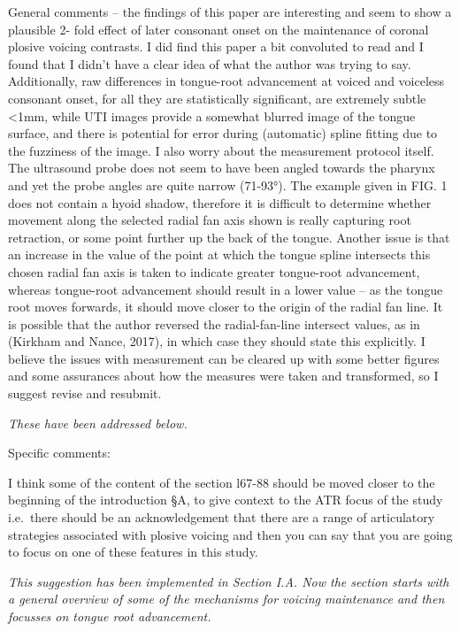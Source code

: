 \documentclass[]{article}
\begin{document}
General comments -- the findings of this paper are interesting and seem
to show a plausible 2- fold effect of later consonant onset on the
maintenance of coronal plosive voicing contrasts. I did find this paper
a bit convoluted to read and I found that I didn't have a clear idea of
what the author was trying to say. Additionally, raw differences in
tongue-root advancement at voiced and voiceless consonant onset, for all
they are statistically significant, are extremely subtle \textless{}1mm,
while UTI images provide a somewhat blurred image of the tongue surface,
and there is potential for error during (automatic) spline fitting due
to the fuzziness of the image. I also worry about the measurement
protocol itself. The ultrasound probe does not seem to have been angled
towards the pharynx and yet the probe angles are quite narrow (71-93°).
The example given in FIG. 1 does not contain a hyoid shadow, therefore
it is difficult to determine whether movement along the selected radial
fan axis shown is really capturing root retraction, or some point
further up the back of the tongue. Another issue is that an increase in
the value of the point at which the tongue spline intersects this chosen
radial fan axis is taken to indicate greater tongue-root advancement,
whereas tongue-root advancement should result in a lower value -- as the
tongue root moves forwards, it should move closer to the origin of the
radial fan line. It is possible that the author reversed the
radial-fan-line intersect values, as in (Kirkham and Nance, 2017), in
which case they should state this explicitly. I believe the issues with
measurement can be cleared up with some better figures and some
assurances about how the measures were taken and transformed, so I
suggest revise and resubmit.

\begin{adjustwidth}{1cm}{} \textit{
These have been addressed below.
} \end{adjustwidth}

Specific comments:

I think some of the content of the section l67-88 should be moved closer
to the beginning of the introduction §A, to give context to the ATR
focus of the study i.e.~there should be an acknowledgement that there
are a range of articulatory strategies associated with plosive voicing
and then you can say that you are going to focus on one of these
features in this study.

\begin{adjustwidth}{1cm}{} \textit{
This suggestion has been implemented in Section I.A. Now the section starts with a general overview of some of the mechanisms for voicing maintenance and then focusses on tongue root advancement.
} \end{adjustwidth}
\end{document}
